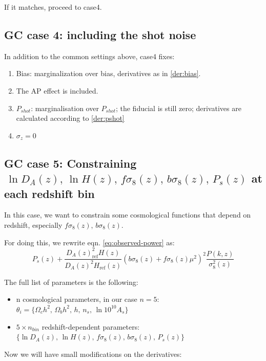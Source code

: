 
If it matches, proceed to case4.

\subsection*{GC case 4: including the shot noise}
In addition to the common settings above, case4 fixes:
\begin{enumerate}
\item  Bias: marginalization over bias, derivatives as in \ref{der:bias}.
\item The AP effect is included.
\item $P_{shot}$: marginalisation over $P_{shot}$; the fiducial is still zero; derivatives are calculated according to \ref{der:pshot} 
\item $\sigma_z = 0$
\end{enumerate}

\subsection*{GC case 5: Constraining  $ \,\ln D_A(z),\, \ln H(z),\,f\sigma_8(z), \, b\sigma_8(z),\, P_{s}(z) $ at each redshift bin}
In this case, we want to constrain some cosmological functions that depend on redshift, especially $f\sigma_8(z), \, b\sigma_8(z)$.


For doing this, we rewrite eqn. \ref{eq:observed-power} as: 
\begin{equation}
 P_s(z) + \frac{D_A(z)^2_\text{ref} H(z)}{D_A(z)^2 H_\text{ref}(z)}     \left(b\sigma_8(z) + f\sigma_8(z) \mu^2 \right)^2 \frac{P(k,z)}{\sigma^2_8(z)}
\end{equation}

The full list of parameters is the following:
\begin{itemize}
\item n cosmological parameters, in our case $n=5$: $\theta_i =\{ \Omega_c h^2,\, \Omega_b h^2,\, h,\, n_s,\, \ln 10^{10} A_s \}$
\item $5\times n_{bin}$ redshift-dependent parameters: $\{ \ln D_A(z),\, \ln H(z),\,f\sigma_8(z), \, b\sigma_8(z),\, P_{s}(z) \}$
\end{itemize}

Now we will have small modifications on the derivatives:

